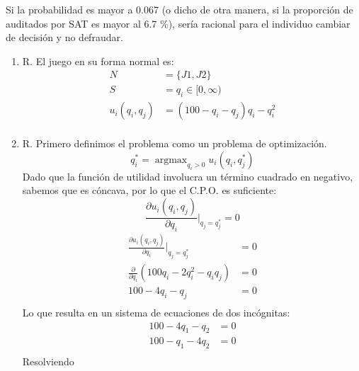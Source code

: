 \documentclass[12pt]{scrartcl} %
\DeclareMathOperator*{\argmax}{argmax}
\begin{document}
\begin{Exercise}[name={Respuesta}]
\begin{enumerate}
          Si la probabilidad es mayor a 0.067 (o dicho de otra manera, si la proporción de auditados por SAT es mayor al 6.7 \%), sería racional para el individuo cambiar de decisión y no defraudar.

  \end{enumerate}

\end{Exercise}

\begin{Exercise}[name={Respuesta}]

  \begin{enumerate}
    \setlength{\itemsep}{0pt}
    \setlength{\parskip}{0pt}
    \setlength{\parsep}{0pt}

    \item R. El juego en su forma normal es:
          \begin{align*}
            N             & = \{J1, J2\}                    \\
            S             & = q_i \in [0, \infty)           \\
            u_i(q_i, q_j) & = (100  - q_i - q_j)q_i - q_i^2 \\
          \end{align*}
    \item R. Primero definimos el problema como un problema de optimización. \[q_i^* = \argmax_{q_i > 0} u_i(q_i, q_j^*)\]
          Dado que la función de utilidad involucra un término cuadrado en negativo, sabemos que es cóncava, por lo que el C.P.O. es suficiente:
          \[\frac{\partial u_i(q_i, q_j)}{\partial q_i} \Bigr|_{q_j = q_j^*} = 0\]
          \begin{align*}
            \frac{\partial u_i(q_i, q_j)}{\partial q_i} \Bigr|_{q_j = q_j^*} & = 0 \\
            \frac{\partial}{\partial q_i} (100q_i-2q_i^2 -q_iq_j)            & = 0 \\
            100 -4q_i -q_j                                                   & = 0 \\
          \end{align*}
          Lo que resulta en un sistema de ecuaciones de dos incógnitas:
          \begin{align*}
            100 -4q_1 -q_2  & = 0 \\
            100 -q_1 - 4q_2 & = 0 \\
          \end{align*}
          Resolviendo

\end{enumerate}
\end{Exercise}
\end{document}
